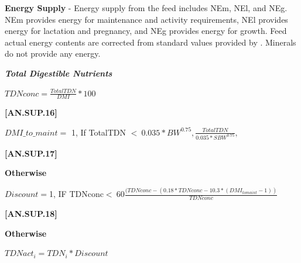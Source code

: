 \documentclass{article}
\begin{document}
\begin{refsection}
\textbf{ Energy Supply} - Energy supply from the feed includes NEm, NEl, and NEg. NEm provides energy for maintenance and activity requirements, NEl provides energy for lactation and pregnancy, and NEg provides energy for growth. Feed actual energy contents are corrected from standard values provided by \textcite{nrc2001}. Minerals do not provide any energy.
    \vspace{0.2cm}


    \textbf{\textit{Total Digestible Nutrients}} 
    \vspace{0.25cm}

    \begin{center}
    \(TDNconc = \frac{TotalTDN}{DMI} * 100\)
    \end{center}
    \vspace{0.5cm}
    
            {\raggedleft \textbf{[AN.SUP.16]}\par}
            \vspace{0.5cm}

    \begin{center}
    \(DMI\_to\_maint =\) 1, If TotalTDN \(<\ 0.035 * BW^{0.75}, \frac{TotalTDN}{0.035*SBW^{0.75}}, \)
    \end{center}
    \vspace{0.5cm}
    
            {\raggedleft \textbf{[AN.SUP.17]}\par}
            \vspace{0.5cm}
            
\textbf{Otherwise}
\vspace{0.25cm}

    \begin{center}
    \(Discount = \)1, IF TDNconc\( <\ 60 \frac{(TDNconc-(0.18*TDNconc-10.3*(DMI_{tomaint}-1))}{TDNconc} \)
    \end{center}
    \vspace{0.5cm}
    
            {\raggedleft \textbf{[AN.SUP.18]}\par}
            \vspace{0.5cm}

\textbf{Otherwise}
\vspace{0.25cm}

    \begin{center}
    \(TDNact_{i} = TDN_{i} * Discount \)
    \end{center}
    \vspace{0.5cm}
    

\end{refsection}
\end{document}
